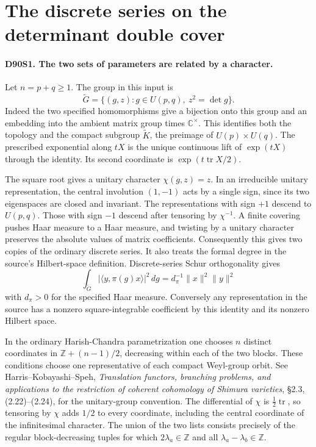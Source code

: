 \section{The discrete series on the determinant double cover}

\paragraph{D90S1. The two sets of parameters are related by a character.}
Let $n=p+q\ge1$. The group in this input is
\[
 \widetilde G=\{(g,z):g\in U(p,q),\ z^2=\det g\}.
\]
Indeed the two specified homomorphisms give a bijection onto this
group and an embedding into the ambient matrix group times
$\mathbb C^\times$. This identifies both the topology and the
compact subgroup $\widetilde K$, the preimage of $U(p)\times U(q)$.
The prescribed exponential along $tX$ is the unique continuous lift
of $\exp(tX)$ through the identity. Its second coordinate is
$\exp(t\operatorname{tr}X/2)$.

The square root gives a unitary character $\chi(g,z)=z$. In an
irreducible unitary representation, the central involution $(1,-1)$
acts by a single sign, since its two eigenspaces are closed and
invariant. The representations with sign $+1$ descend to $U(p,q)$.
Those with sign $-1$ descend after tensoring by $\chi^{-1}$. A
finite covering pushes Haar measure to a Haar measure, and twisting
by a unitary character preserves the absolute values of matrix
coefficients. Consequently this gives two copies of the ordinary
discrete series. It also treats the formal degree in the source's
Hilbert-space definition. Discrete-series Schur orthogonality gives
\[
 \int_{\widetilde G}|\langle y,\pi(g)x\rangle|^2\,dg
       =d_\pi^{-1}\|x\|^2\|y\|^2
\]
with $d_\pi>0$ for the specified Haar measure. Conversely any
representation in the source has a nonzero square-integrable
coefficient by this identity and its nonzero Hilbert space.

In the ordinary Harish-Chandra parametrization one chooses $n$
distinct coordinates in $\mathbb Z+(n-1)/2$, decreasing within
each of the two blocks. These conditions choose one representative
of each compact Weyl-group orbit. See Harris--Kobayashi--Speh,
\emph{Translation functors, branching problems, and applications to the
restriction of coherent cohomology of Shimura varieties},
\S2.3, (2.22)--(2.24), for the unitary-group convention.
The differential of $\chi$ is $\tfrac12\operatorname{tr}$, so
tensoring by $\chi$ adds $1/2$ to every coordinate, including the
central coordinate of the infinitesimal character. The union of the
two lists consists precisely of the regular block-decreasing tuples
for which $2\lambda_a\in\mathbb Z$ and all
$\lambda_a-\lambda_b\in\mathbb Z$.

